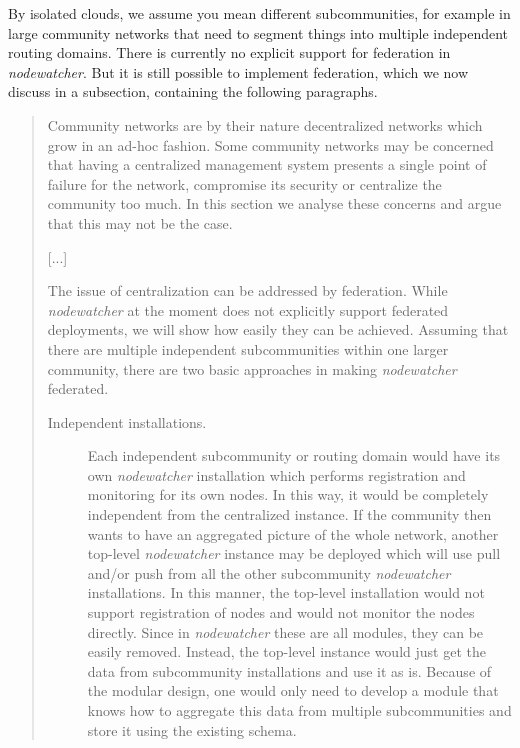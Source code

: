 \documentclass[12pt,twoside,a4paper]{report}
\newcommand{\nodewatcher}{\textit{nodewatcher}}
\begin{document}
By isolated clouds, we assume you mean different subcommunities, for example in large community networks that need to segment things into multiple independent routing domains.
There is currently no explicit support for federation in \nodewatcher{}.
But it is still possible to implement federation, which we now discuss in a subsection, containing the following paragraphs.

\begin{quote}
Community networks are by their nature decentralized networks which grow in an ad-hoc fashion.
Some community networks may be concerned that having a centralized management system presents a single point of failure for the network, compromise its security or centralize the community too much.
In this section we analyse these concerns and argue that this may not be the case.

[...]

The issue of centralization can be addressed by federation.
While \nodewatcher{} at the moment does not explicitly support federated deployments, we will show how easily they can be achieved.
Assuming that there are multiple independent subcommunities within one larger community, there are two basic approaches in making \nodewatcher{} federated.

\begin{description}
    \item[Independent installations.] Each independent subcommunity or routing domain would have its own \nodewatcher{} installation which performs registration and monitoring for its own nodes.
    In this way, it would be completely independent from the centralized instance.
    If the community then wants to have an aggregated picture of the whole network, another top-level \nodewatcher{} instance may be deployed which will use pull and/or push from all the other subcommunity \nodewatcher{} installations.
    In this manner, the top-level installation would not support registration of nodes and would not monitor the nodes directly.
    Since in \nodewatcher{} these are all modules, they can be easily removed.
    Instead, the top-level instance would just get the data from subcommunity installations and use it as is.
    Because of the modular design, one would only need to develop a module that knows how to aggregate this data from multiple subcommunities and store it using the existing schema.


\end{description}
\end{quote}
\end{document}
